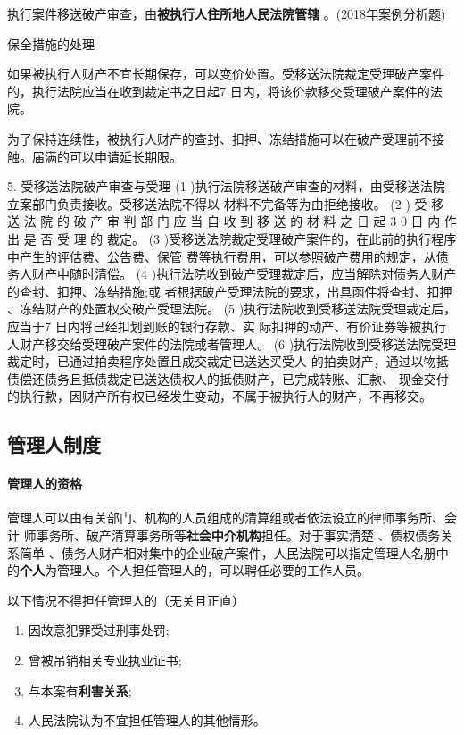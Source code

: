 \documentclass[UTF8,12pt]{ctexart}
\numberwithin{equation}{section} %
\numberwithin{figure}{section}
\numberwithin{table}{section}
\begin{document}
	执行案件移送破产审查，由\textbf{被执行人住所地人民法院管辖} 。(2018年案例分析题)
	
	保全措施的处理
	
	如果被执行人财产不宜长期保存，可以变价处置。受移送法院裁定受理破产案件 的，执行法院应当在收到裁定书之日起7 日内，将该价款移交受理破产案件的法院。
	
	为了保持连续性，被执行人财产的查封、扣押、冻结措施可以在破产受理前不接触。届满的可以申请延长期限。 
	
	5. 受移送法院破产审查与受理
	(1 )执行法院移送破产审查的材料，由受移送法院立案部门负责接收。受移送法院不得以 材料不完备等为由拒绝接收。
	(2 ) 受 移 送 法 院 的 破 产 审 判 部 门 应 当 自 收 到 移 送 的 材 料 之 日 起 3 0 日 内 作 出 是 否 受 理 的
	裁定。
	(3 )受移送法院裁定受理破产案件的，在此前的执行程序中产生的评估费、公告费、保管 费等执行费用，可以参照破产费用的规定，从债务人财产中随时清偿。
	(4 )执行法院收到破产受理裁定后，应当解除对债务人财产的查封、扣押、冻结措施;或 者根据破产受理法院的要求，出具函件将查封、扣押 、冻结财产的处置权交破产受理法院。
	 (5 )执行法院收到受移送法院受理裁定后，应当于7 日内将已经扣划到账的银行存款、实 际扣押的动产、有价证券等被执行人财产移交给受理破产案件的法院或者管理人。
	(6 )执行法院收到受移送法院受理裁定时，已通过拍卖程序处置且成交裁定已送达买受人 的拍卖财产，通过以物抵债偿还债务且抵债裁定已送达债权人的抵债财产，已完成转账、汇款、 现金交付的执行款，因财产所有权已经发生变动，不属于被执行人的财产，不再移交。

	
	\subsection{管理人制度}
	\paragraph{管理人的资格}
	管理人可以由有关部门、机构的人员组成的清算组或者依法设立的律师事务所、会计 师事务所、破产清算事务所等\textbf{社会中介机构}担任。对于事实清楚 、债权债务关系简单 、债务人财产相对集中的企业破产案件，人民法院可以指定管理人名册中的\textbf{个人}为管理人。个人担任管理人的，可以聘任必要的工作人员。
	
	以下情况不得担任管理人的（无关且正直）
	\begin{enumerate}
		\item 因故意犯罪受过刑事处罚;
		
		\item 曾被吊销相关专业执业证书;
		
		\item 与本案有\textbf{利害关系};
		
		\item 人民法院认为不宜担任管理人的其他情形。
	\end{enumerate}
\end{document}
